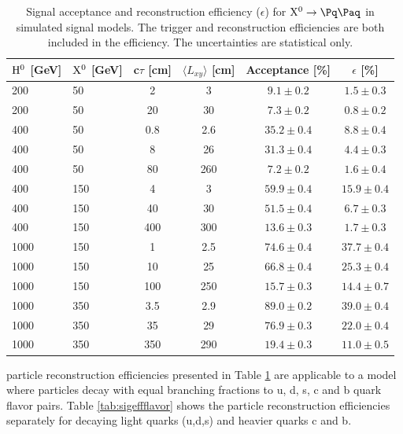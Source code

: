 \begin{table}[htbp]
\caption{
Signal acceptance and reconstruction efficiency ($\epsilon$) for $\X \to \qq$ in simulated signal models.
The trigger and reconstruction efficiencies are both included in the efficiency.
The uncertainties are statistical only.\label{tab:sigeff}}
\centering
\begin{tabular}{llcccc}
\hline
$\mathrm{H}^{0}$ [GeV] & $\mathrm{X^{0}}$ [GeV] & c$\tau$ [cm] & $\langle L_{xy} \rangle$ [cm] & Acceptance [\%] & $\epsilon$ [\%] \\
\hline
200 & 50 & 2 & 3 & $9.1\pm0.2$ & $1.5\pm0.3$ \\
200 & 50 & 20 & 30 & $7.3\pm0.2$ & $0.8\pm0.2$ \\
\hline
400 & 50 & 0.8 & 2.6 & $35.2\pm0.4$ & $8.8\pm0.4$ \\
400 & 50 & 8 & 26 & $31.3\pm0.4$ & $4.4\pm0.3$ \\
400 & 50 & 80 & 260 & $7.2\pm0.2$ & $1.6\pm0.4$ \\
\hline
400 & 150 & 4 & 3 & $59.9\pm0.4$ & $15.9\pm0.4$ \\
400 & 150 & 40 & 30 & $51.5\pm0.4$ & $6.7\pm0.3$ \\
400 & 150 & 400 & 300 & $13.6\pm0.3$ & $1.7\pm0.3$ \\
\hline 
1000 & 150 & 1 & 2.5 & $74.6\pm0.4$ & $37.7\pm0.4$ \\
1000 & 150 & 10 & 25 & $66.8\pm0.4$ & $25.3\pm0.4$ \\ 
1000 & 150 & 100 & 250 & $15.7\pm0.3$ & $14.4\pm0.7$ \\
\hline 
1000 & 350 & 3.5 & 2.9 & $89.0\pm0.2$ & $39.0\pm0.4$ \\
1000 & 350 & 35 & 29 & $76.9\pm0.3$ & $22.0\pm0.4$ \\
1000 & 350 & 350 & 290 & $19.4\pm0.3$ & $11.0\pm0.5$ \\
\hline
\end{tabular}
\end{table}

\X particle reconstruction efficiencies presented in Table \ref{tab:sigeff} 
are applicable to a model where \X particles decay with equal branching fractions to 
u, d, s, c and b quark flavor pairs.
Table \ref{tab:sigeffflavor} shows the \X particle reconstruction efficiencies separately for 
\X decaying light quarks (u,d,s) and
heavier quarks c and b. 

